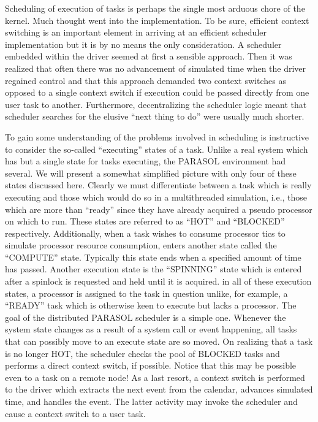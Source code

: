 \documentclass[11pt]{article}
\begin{document}
Scheduling of execution of tasks is perhaps the single most arduous chore of the kernel. Much
thought went into the implementation. To be sure, efficient context switching is an important
element in arriving at an efficient scheduler implementation but it is by no means the only
consideration. A scheduler embedded within the driver seemed at first a sensible approach. Then
it was realized that often there was no advancement of simulated time when the driver regained
control and that this approach demanded two context switches as opposed to a single context
switch if execution could be passed directly from one user task to another. Furthermore,
decentralizing the scheduler logic meant that scheduler searches for the elusive ``next thing to do''
were usually much shorter.

To gain some understanding of the problems involved in scheduling   is instructive to consider the
so-called ``executing'' states of a task. Unlike a real system which has but a single state for tasks
executing, the PARASOL environment had several. We will present a somewhat simplified picture
with only four of these states discussed here. Clearly we must differentiate between a task which
is really executing and those which would do so in a multithreaded simulation, i.e., those which
are more than ``ready'' since they have already acquired a pseudo processor on which to run. These
states are referred to as ``HOT'' and ``BLOCKED'' respectively. Additionally, when a task wishes
to consume processor tics to simulate processor resource consumption, enters another state called
the ``COMPUTE'' state. Typically this state ends when a specified amount of time has passed.
Another execution state is the ``SPINNING'' state which is entered after a spinlock is requested and
held until it is acquired. in all of these execution states, a processor is assigned to the task in
question unlike, for example, a ``READY'' task which is otherwise keen to execute but lacks a
processor.
The goal of the distributed PARASOL scheduler is a simple one. Whenever the system state  
changes as a result of a system call or event happening, all tasks that can possibly move to an  
execute state are so moved. On realizing that a task is no longer HOT, the scheduler checks the  
pool of BLOCKED tasks and performs a direct context switch, if possible. Notice that this may be  
possible even to a task on a remote node! As a last resort, a context switch is performed to the 
driver which extracts the next event from the calendar, advances simulated time, and handles the
event. The latter activity may invoke the scheduler and cause a context switch to a user task.
\end{document}
